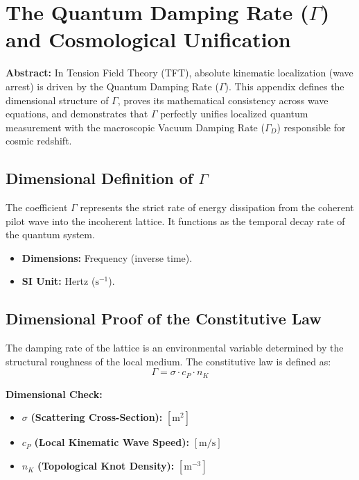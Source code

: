 \chapter{The Quantum Damping Rate ($\Gamma$) and Cosmological Unification}
\label{app:quantum_damping}

\textbf{Abstract:} In Tension Field Theory (TFT), absolute kinematic localization (wave arrest) is driven by the Quantum Damping Rate ($\Gamma$). This appendix defines the dimensional structure of $\Gamma$, proves its mathematical consistency across wave equations, and demonstrates that $\Gamma$ perfectly unifies localized quantum measurement with the macroscopic Vacuum Damping Rate ($\Gamma_D$) responsible for cosmic redshift.

\section{Dimensional Definition of $\Gamma$}
The coefficient $\Gamma$ represents the strict rate of energy dissipation from the coherent pilot wave into the incoherent lattice. It functions as the temporal decay rate of the quantum system.
\begin{itemize}
    \item \textbf{Dimensions:} Frequency (inverse time).
    \item \textbf{SI Unit:} Hertz ($\text{s}^{-1}$).
\end{itemize}

\section{Dimensional Proof of the Constitutive Law}
The damping rate of the lattice is an environmental variable determined by the structural roughness of the local medium. The constitutive law is defined as:
\begin{equation}
    \Gamma = \sigma \cdot c_P \cdot n_K
\end{equation}

\textbf{Dimensional Check:}
\begin{itemize}
    \item $\sigma$ \textbf{(Scattering Cross-Section):} $[\text{m}^2]$
    \item $c_P$ \textbf{(Local Kinematic Wave Speed):} $[\text{m/s}]$
    \item $n_K$ \textbf{(Topological Knot Density):} $[\text{m}^{-3}]$
\end{itemize}

